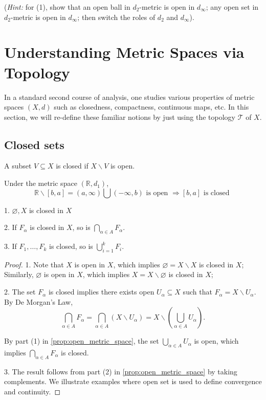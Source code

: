 ({\it Hint:} for (1), show that an open ball in \({d}_{2}\)-metric is open in \({d}_{\infty }\); any open set in \({d}_{2}\)-metric is open in \({d}_{\infty }\); then switch the roles of \({d}_{2}\) and \({d}_{\infty }\)).


\section{Understanding Metric Spaces via Topology}
In a standard second course of analysis, one studies various properties of metric spaces $(X,d)$ such as closedness, compactness, continuous maps, etc. In this section, we will re-define these familiar notions by just using the topology $\mathcal{T}$ of $X$.

\subsection{Closed sets}
\begin{definition}[Closed] A subset \(V \subseteq  X\) is closed if \(X \smallsetminus  V\) is open.
\end{definition}

\begin{example} Under the metric space \(\left( {\mathbb{R},{d}_{1}}\right)\),
\[
\mathbb{R} \smallsetminus  \left\lbrack  {b,a}\right\rbrack   = \left( {a,\infty }\right) \bigcup \left( {-\infty,b}\right) \text{ is open } \Rightarrow  \left\lbrack  {b,a}\right\rbrack  \text{ is closed }
\]

1. \(\varnothing,X\) is closed in \(X\)

2. If \({F}_{\alpha }\) is closed in \(X\), so is \(\mathop{\bigcap }\limits_{{\alpha  \in  A}}{F}_{\alpha }\).

3. If \({F}_{1},\ldots,{F}_{k}\) is closed, so is \(\mathop{\bigcup }\limits_{{i = 1}}^{k}{F}_{i}\).
\end{example}

\begin{proof} 1. Note that \(X\) is open in \(X\), which implies \(\varnothing  = X \smallsetminus  X\) is closed in \(X\); Similarly, \(\varnothing\) is open in \(X\), which implies \(X = X \smallsetminus  \varnothing\) is closed in \(X\);

2. The set \({F}_{\alpha }\) is closed implies there exists open \({U}_{\alpha } \subseteq  X\) such that \({F}_{\alpha } = X \smallsetminus  {U}_{\alpha }\). By De Morgan's Law,
\[
\mathop{\bigcap }\limits_{{\alpha  \in  A}}{F}_{\alpha } = \mathop{\bigcap }\limits_{{\alpha  \in  A}}\left( {X \smallsetminus  {U}_{\alpha }}\right)  = X \smallsetminus  \left( {\mathop{\bigcup }\limits_{{\alpha  \in  A}}{U}_{\alpha }}\right).
\]

By part (1) in \autoref{prop:open_metric_space}, the set \(\mathop{\bigcup }\limits_{{\alpha  \in  A}}{U}_{\alpha }\) is open, which implies \(\mathop{\bigcap }\limits_{{\alpha  \in  A}}{F}_{\alpha }\) is closed.

3. The result follows from part (2) in \autoref{prop:open_metric_space} by taking complements. We illustrate examples where open set is used to define convergence and continuity.
\end{proof}

